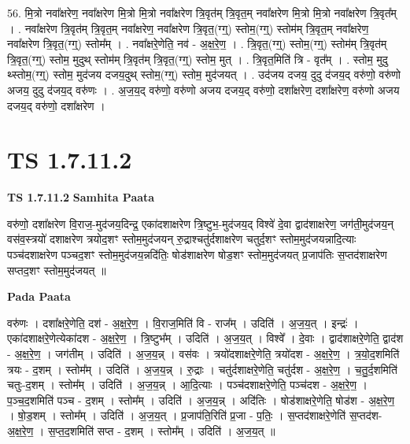 \documentclass[17pt]{extarticle}
\begin{document}
56. मि॒त्रो नवा᳚क्षरेण॒ नवा᳚क्षरेण मि॒त्रो मि॒त्रो नवा᳚क्षरेण त्रि॒वृत॑म् त्रि॒वृत॒म् नवा᳚क्षरेण मि॒त्रो मि॒त्रो नवा᳚क्षरेण त्रि॒वृत᳚म् । . नवा᳚क्षरेण त्रि॒वृत॑म् त्रि॒वृत॒म् नवा᳚क्षरेण॒ नवा᳚क्षरेण त्रि॒वृत॒(ग्ग्॒) स्तोम॒(ग्ग्॒) स्तोम॑म् त्रि॒वृत॒म् 
नवा᳚क्षरेण॒ नवा᳚क्षरेण त्रि॒वृत॒(ग्ग्॒) स्तोम᳚म् । . नवा᳚क्षरे॒णेति॒ नव॑ - अ॒क्ष॒रे॒ण॒ । . त्रि॒वृत॒(ग्ग्॒) स्तोम॒(ग्ग्॒) स्तोम॑म् त्रि॒वृत॑म् त्रि॒वृत॒(ग्ग्॒) स्तोम॒ मुदुथ् स्तोम॑म् त्रि॒वृत॑म् त्रि॒वृत॒(ग्ग्॒) स्तोम॒ मुत् । . त्रि॒वृत॒मिति॑ त्रि - वृत᳚म् । . स्तोम॒ मुदु थ्स्तोम॒(ग्ग्॒) स्तोम॒ मुद॑जय दजय॒दुथ् स्तोम॒(ग्ग्॒) स्तोम॒ मुद॑जयत् । . उद॑जय दजय॒ दुदु द॑जय॒द् वरु॑णो॒ वरु॑णो अजय॒ दुदु द॑जय॒द् वरु॑णः । . अ॒ज॒य॒द् वरु॑णो॒ वरु॑णो अजय दजय॒द् वरु॑णो॒ दशा᳚क्षरेण॒ दशा᳚क्षरेण॒ वरु॑णो अजय दजय॒द् वरु॑णो॒ दशा᳚क्षरेण । \newline
\pagebreak
{}

\section{ TS 1.7.11.2 }

\textbf{TS 1.7.11.2 } \newline
\textbf{Samhita Paata} \newline

वरु॑णो॒ दशा᳚क्षरेण वि॒राज॒-मुद॑जय॒दिन्द्र॒ एका॑दशाक्षरेण त्रि॒ष्टुभ॒-मुद॑जय॒द् विश्वे॑ दे॒वा द्वाद॑शाक्षरेण॒ जग॑ती॒मुद॑जय॒न् वस॑व॒स्त्रयो॑ दशाक्षरेण त्रयोद॒शꣳ स्तोम॒मुद॑जयन् रु॒द्राश्चतु॑र्दशाक्षरेण चतुर्द॒शꣳ स्तोम॒मुद॑जयन्नादि॒त्याः पञ्च॑दशाक्षरेण पञ्चद॒शꣳ स्तोम॒मुद॑जय॒न्नदि॑तिः॒ षोड॑शाक्षरेण षोड॒शꣳ स्तोम॒मुद॑जयत् प्र॒जाप॑तिः स॒प्तद॑शाक्षरेण सप्तद॒शꣳ स्तोम॒मुद॑जयत् ॥ \newline

\textbf{Pada Paata} \newline

वरु॑णः । दशा᳚क्षरे॒णेति॒ दश॑ - अ॒क्ष॒रे॒ण॒ । वि॒राज॒मिति॑ वि - राज᳚म् । उदिति॑ । अ॒ज॒य॒त् । इन्द्रः॑ । एका॑दशाक्षरे॒णेत्येका॑दश - अ॒क्ष॒रे॒ण॒ । त्रि॒ष्टुभ᳚म् । उदिति॑ । अ॒ज॒य॒त् । विश्वे᳚ । दे॒वाः । द्वाद॑शाक्षरे॒णेति॒ द्वाद॑श - अ॒क्ष॒रे॒ण॒ । जग॑तीम् । उदिति॑ । अ॒ज॒य॒न्न् । वस॑वः । त्रयो॑दशाक्षरे॒णेति॒ त्रयो॑दश - अ॒क्ष॒रे॒ण॒ । त्र॒यो॒द॒शमिति॑ त्रयः - द॒शम् । स्तोम᳚म् । उदिति॑ । अ॒ज॒य॒न्न् । रु॒द्राः । चतु॑र्दशाक्षरे॒णेति॒ चतु॑र्दश - अ॒क्ष॒रे॒ण॒ । च॒तु॒र्द॒शमिति॑ चतुः-द॒शम् । स्तोम᳚म् । उदिति॑ । अ॒ज॒य॒न्न् । आ॒दि॒त्याः । पञ्च॑दशाक्षरे॒णेति॒ पञ्च॑दश - अ॒क्ष॒रे॒ण॒ । प॒ञ्च॒द॒शमिति॑ पञ्च - द॒शम् । स्तोम᳚म् । उदिति॑ । अ॒ज॒य॒॒न्न् । अदि॑तिः । षोड॑शाक्षरे॒णेति॒ षोड॑श - अ॒क्ष॒रे॒ण॒ । षो॒ड॒शम् । स्तोम᳚म् । उदिति॑ । अ॒ज॒य॒त् । प्र॒जाप॑ति॒रिति॑ प्र॒जा - प॒तिः॒ । स॒प्तद॑शाक्षरे॒णेति॑ स॒प्तद॑श-अ॒क्ष॒रे॒ण॒ । स॒प्त॒द॒शमिति॑ सप्त - द॒शम् । स्तोम᳚म् । उदिति॑ । अ॒ज॒य॒त् ॥  \newline
\end{document}
